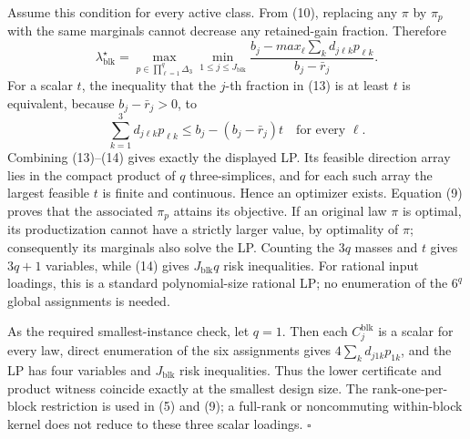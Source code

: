 Assume this condition for every active class. From (10), replacing any \(\pi\) by \(\pi_p\) with the same marginals cannot decrease any retained-gain fraction. Therefore
\[
\lambda_{\mathrm{blk}}^\star
=\max_{p\in\prod_{\ell=1}^q\Delta_3}
\min_{1\le j\le J_{\mathrm{blk}}}
\frac{b_j-max_\ell\sum_kd_{j\ell k}p_{\ell k}}
{b_j-\bar r_j}.
\tag{13}
\]
For a scalar \(t\), the inequality that the \(j\)-th fraction in (13) is at least \(t\) is equivalent, because \(b_j-\bar r_j>0\), to
\[
\sum_{k=1}^3d_{j\ell k}p_{\ell k}
\le b_j-(b_j-\bar r_j)t
\quad\text{for every }\ell.
\tag{14}
\]
Combining (13)--(14) gives exactly the displayed LP. Its feasible direction array lies in the compact product of \(q\) three-simplices, and for each such array the largest feasible \(t\) is finite and continuous. Hence an optimizer exists. Equation (9) proves that the associated \(\pi_p\) attains its objective. If an original law \(\pi\) is optimal, its productization cannot have a strictly larger value, by optimality of \(\pi\); consequently its marginals also solve the LP. Counting the \(3q\) masses and \(t\) gives \(3q+1\) variables, while (14) gives \(J_{\mathrm{blk}}q\) risk inequalities. For rational input loadings, this is a standard polynomial-size rational LP; no enumeration of the \(6^q\) global assignments is needed.

As the required smallest-instance check, let \(q=1\). Then each \(C_j^{\mathrm{blk}}\) is a scalar for every law, direct enumeration of the six assignments gives \(4\sum_kd_{j1k}p_{1k}\), and the LP has four variables and \(J_{\mathrm{blk}}\) risk inequalities. Thus the lower certificate and product witness coincide exactly at the smallest design size. The rank-one-per-block restriction is used in (5) and (9); a full-rank or noncommuting within-block kernel does not reduce to these three scalar loadings. \(\square\)